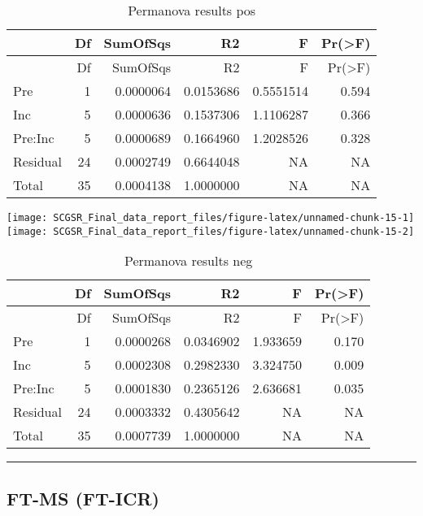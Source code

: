 \documentclass[
]{article}
\begin{document}
\begin{longtable}[]{@{}lrrrrr@{}}
\caption{Permanova results pos}\tabularnewline
\toprule\noalign{}
& Df & SumOfSqs & R2 & F & Pr(\textgreater F) \\
\midrule\noalign{}
\endfirsthead
\toprule\noalign{}
& Df & SumOfSqs & R2 & F & Pr(\textgreater F) \\
\midrule\noalign{}
\endhead
\bottomrule\noalign{}
\endlastfoot
Pre & 1 & 0.0000064 & 0.0153686 & 0.5551514 & 0.594 \\
Inc & 5 & 0.0000636 & 0.1537306 & 1.1106287 & 0.366 \\
Pre:Inc & 5 & 0.0000689 & 0.1664960 & 1.2028526 & 0.328 \\
Residual & 24 & 0.0002749 & 0.6644048 & NA & NA \\
Total & 35 & 0.0004138 & 1.0000000 & NA & NA \\
\end{longtable}

\texttt{[image: SCGSR\_Final\_data\_report\_files/figure-latex/unnamed-chunk-15-1]}
\texttt{[image: SCGSR\_Final\_data\_report\_files/figure-latex/unnamed-chunk-15-2]}

\begin{longtable}[]{@{}lrrrrr@{}}
\caption{Permanova results neg}\tabularnewline
\toprule\noalign{}
& Df & SumOfSqs & R2 & F & Pr(\textgreater F) \\
\midrule\noalign{}
\endfirsthead
\toprule\noalign{}
& Df & SumOfSqs & R2 & F & Pr(\textgreater F) \\
\midrule\noalign{}
\endhead
\bottomrule\noalign{}
\endlastfoot
Pre & 1 & 0.0000268 & 0.0346902 & 1.933659 & 0.170 \\
Inc & 5 & 0.0002308 & 0.2982330 & 3.324750 & 0.009 \\
Pre:Inc & 5 & 0.0001830 & 0.2365126 & 2.636681 & 0.035 \\
Residual & 24 & 0.0003332 & 0.4305642 & NA & NA \\
Total & 35 & 0.0007739 & 1.0000000 & NA & NA \\
\end{longtable}

\begin{center}\rule{0.5\linewidth}{0.5pt}\end{center}

\hypertarget{ft-ms-ft-icr}{%
\subsection{FT-MS (FT-ICR)}\label{ft-ms-ft-icr}}
\end{document}
